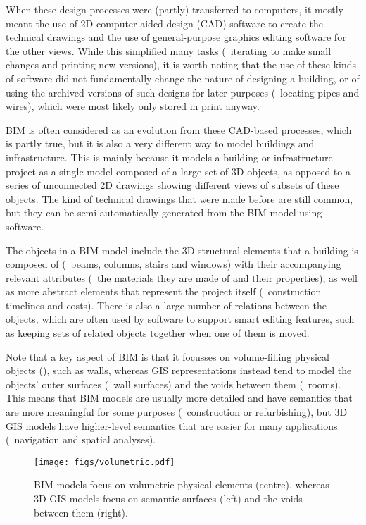 When these design processes were (partly) transferred to computers, it mostly meant the use of 2D computer-aided design (CAD) software to create the technical drawings and the use of general-purpose graphics editing software for the other views.
While this simplified many tasks (\eg\ iterating to make small changes and printing new versions), it is worth noting that the use of these kinds of software did not fundamentally change the nature of designing a building, or of using the archived versions of such designs for later purposes (\eg\ locating pipes and wires), which were most likely only stored in print anyway.

BIM is often considered as an evolution from these CAD-based processes, which is partly true, but it is also a very different way to model buildings and infrastructure.
This is mainly because it models a building or infrastructure project as a single model composed of a large set of 3D objects, as opposed to a series of unconnected 2D drawings showing different views of subsets of these objects.
The kind of technical drawings that were made before are still common, but they can be semi-automatically generated from the BIM model using software.

The objects in a BIM model include the 3D structural elements that a building is composed of (\eg\ beams, columns, stairs and windows) with their accompanying relevant attributes (\eg\ the materials they are made of and their properties), as well as more abstract elements that represent the project itself (\eg\ construction timelines and costs).
There is also a large number of relations between the objects, which are often used by software to support smart editing features, such as keeping sets of related objects together when one of them is moved.

Note that a key aspect of BIM is that it focusses on volume-filling physical objects (), such as walls, whereas GIS representations instead tend to model the objects' outer surfaces (\eg\ wall surfaces) and the voids between them (\eg\ rooms).
This means that BIM models are usually more detailed and have semantics that are more meaningful for some purposes (\eg\ construction or refurbishing), but 3D GIS models have higher-level semantics that are easier for many applications (\eg\  navigation and spatial analyses).

\begin{figure}
\centering
\texttt{[image: figs/volumetric.pdf]}
\caption{BIM models focus on volumetric physical elements (centre), whereas 3D GIS models focus on semantic surfaces (left) and the voids between them (right).}%
\label{fig:volumetric}
\end{figure}

